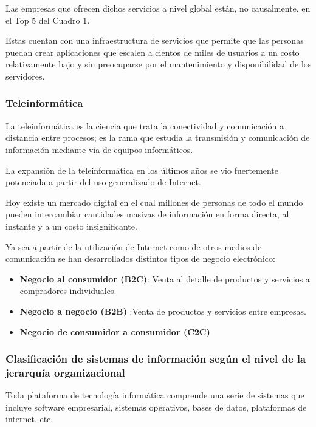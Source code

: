 \documentclass[a4paper, 12pt]{article}
\begin{document}
Las empresas que ofrecen dichos servicios a nivel global están, no causalmente, en el Top 5 del Cuadro 1.

Estas  cuentan con una infraestructura de servicios que permite que las personas puedan crear aplicaciones que escalen a cientos de miles de usuarios a un costo relativamente bajo y sin preocuparse por el mantenimiento y disponibilidad de los servidores.

\subsubsection{Teleinformática}
\label{TeleInformatica}


La teleinformática es la ciencia que trata la conectividad y comunicación a distancia entre procesos; es la rama que estudia la transmisión y comunicación de información mediante vía de equipos informáticos.

La expansión de la teleinformática en los últimos años se vio fuertemente potenciada a partir del uso generalizado de Internet.

Hoy existe un mercado digital en el cual millones de personas de todo el mundo pueden intercambiar cantidades masivas de información en forma directa, al instante y a un costo insignificante.

Ya sea a partir de la utilización de Internet como de otros medios de comunicación se han desarrollados distintos tipos de negocio electrónico:

\begin{itemize}
    \item \textbf{Negocio al consumidor (B2C)}:  Venta al detalle de productos y servicios a compradores individuales.
    
    \item \textbf{Negocio a negocio (B2B)} :Venta de productos y servicios entre empresas.
    
    \item \textbf{Negocio de consumidor a consumidor (C2C)}
\end{itemize}


\subsubsection{Clasificación de	sistemas de información según el nivel de la jerarquía organizacional}
\label{ClasificacionJerarquia}

Toda plataforma de tecnología informática comprende una serie de sistemas que incluye software empresarial, sistemas operativos, bases de datos, plataformas de internet. etc.
\end{document}
